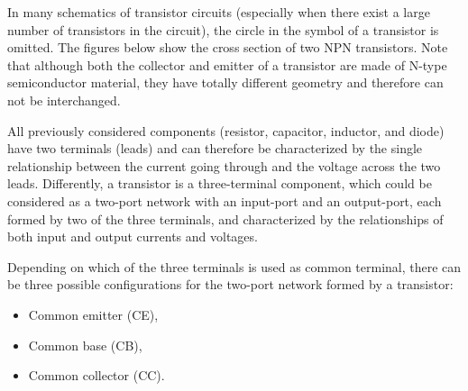 

In many schematics of transistor circuits (especially when there exist a
large number of transistors in the circuit), the circle in the symbol of
a transistor is omitted. The figures below show the cross section of two
NPN transistors. Note that although both the collector and emitter of a
transistor are made of N-type semiconductor material, they have totally
different geometry and therefore can not be interchanged.



All previously considered components (resistor, capacitor, inductor, and 
diode) have two terminals (leads) and can therefore be characterized by 
the single relationship between the current going through and the voltage 
across the two leads. Differently, a transistor is a three-terminal component,
which could be considered as a two-port network with an input-port and an
output-port, each formed by two of the three terminals, and characterized
by the relationships of both input and output currents and voltages.

Depending on which of the three terminals is used as common terminal, there
can be three possible configurations for the two-port network formed by a
transistor: 
\begin{itemize}
\item Common emitter (CE), 
\item Common base (CB), 
\item Common collector (CC).
\end{itemize}



